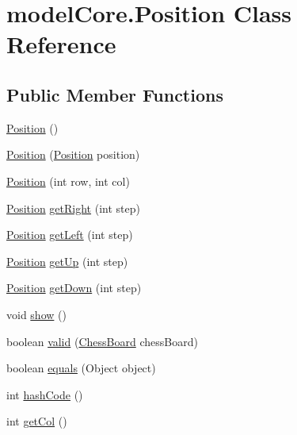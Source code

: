 \hypertarget{classmodel_core_1_1_position}{\section{model\+Core.\+Position Class Reference}
\label{classmodel_core_1_1_position}
}
\subsection*{Public Member Functions}
\begin{DoxyCompactItemize}
\item 
\hyperlink{classmodel_core_1_1_position_a689df995977dd8da01d733c5b0940e8b}{Position} ()
\item 
\hyperlink{classmodel_core_1_1_position_aaf7d9f851733f7e4361eadab881b5d1e}{Position} (\hyperlink{classmodel_core_1_1_position}{Position} position)
\item 
\hyperlink{classmodel_core_1_1_position_a9a5ab27a476a183a12f14b9644a74063}{Position} (int row, int col)
\item 
\hyperlink{classmodel_core_1_1_position}{Position} \hyperlink{classmodel_core_1_1_position_a414339238322766507ee2ce61e4f18fc}{get\+Right} (int step)
\item 
\hyperlink{classmodel_core_1_1_position}{Position} \hyperlink{classmodel_core_1_1_position_a43c2653aa7b9bd2ece8a746aa488e890}{get\+Left} (int step)
\item 
\hyperlink{classmodel_core_1_1_position}{Position} \hyperlink{classmodel_core_1_1_position_a922189e8018dd157a322dd55581ccd19}{get\+Up} (int step)
\item 
\hyperlink{classmodel_core_1_1_position}{Position} \hyperlink{classmodel_core_1_1_position_ad22eb535ce11e1ca0a846a98c37e2b43}{get\+Down} (int step)
\item 
void \hyperlink{classmodel_core_1_1_position_aa88918fe5d6446eb3c9f04c0b1ba92d0}{show} ()
\item 
boolean \hyperlink{classmodel_core_1_1_position_aeb1285fd0e8aa11728692d3a40c644f5}{valid} (\hyperlink{classmodel_core_1_1_chess_board}{Chess\+Board} chess\+Board)
\item 
boolean \hyperlink{classmodel_core_1_1_position_ad6cd6dc938426f8e328374e6130e51a6}{equals} (Object object)
\item 
int \hyperlink{classmodel_core_1_1_position_a87f61d46274b310c7c4edae150f20d89}{hash\+Code} ()
\item 
int \hyperlink{classmodel_core_1_1_position_a2e369524c690d77e4fe5a2f387d6351c}{get\+Col} ()
\end{DoxyCompactItemize}


